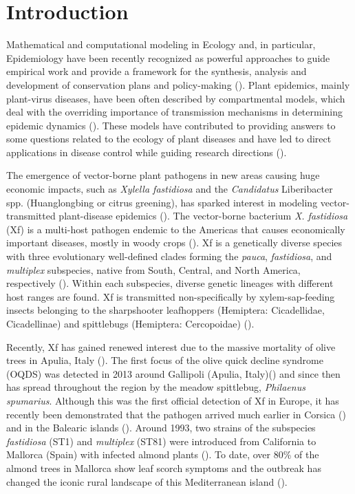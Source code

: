 \section{Introduction}

Mathematical and computational modeling in Ecology and, in particular,
Epidemiology have been recently recognized as powerful approaches to guide
empirical work and provide a framework for the synthesis, analysis and
development of conservation plans and policy-making
(\cite{levin1992mathematics,murray1989mathematical,sarkar2006biodiversity,Chew2014}).
Plant epidemics, mainly plant-virus diseases, have been often described by
compartmental models, which deal with the overriding importance of transmission
mechanisms in determining epidemic dynamics
(\cite{Jeger1998,Jeger2004,Madden2000}). These models have contributed to
providing answers to some questions related to the ecology of plant diseases
and have led to direct applications in disease control while guiding research
directions (\cite{Jeger2019}).

The emergence of vector-borne plant pathogens in new areas causing huge
economic impacts, such as \textit{Xylella fastidiosa} and the
\textit{Candidatus} Liberibacter spp. (Huanglongbing or citrus greening), has
sparked interest in modeling vector-transmitted plant-disease epidemics
(\cite{chiyaka2012modeling,Jeger2019}). The vector-borne bacterium \textit{X.
    fastidiosa} (Xf) is a multi-host pathogen endemic to the Americas that
causes
economically important diseases, mostly in woody crops (\cite{Hopkins2002}). Xf
is a genetically diverse species with three evolutionary well-defined clades
forming the \textit{pauca}, \textit{fastidiosa}, and \textit{multiplex}
subspecies, native from South, Central, and North America, respectively
(\cite{vanhove2019genomic}). Within each subspecies, diverse genetic lineages
with different host ranges are found. Xf is transmitted non-specifically by
xylem-sap-feeding insects belonging to the sharpshooter leafhoppers (Hemiptera:
Cicadellidae, Cicadellinae) and spittlebugs (Hemiptera: Cercopoidae)
(\cite{Redak2004}).

Recently, Xf has gained renewed interest due to the massive mortality of
olive trees in Apulia, Italy (\cite{saponari2019xylella}). The first focus of
the olive quick decline syndrome (OQDS) was detected in 2013 around Gallipoli
(Apulia, Italy)(\cite{saponari2013identification}) and since then has spread
throughout the region by the meadow spittlebug, \textit{Philaenus spumarius}.
Although this was the first official detection of Xf in Europe, it has recently
been demonstrated that the pathogen arrived much earlier in Corsica
(\cite{Soubeyrand2018}) and in the Balearic islands (\cite{Moralejo2020}).
Around 1993, two strains of the subspecies \textit{fastidiosa} (ST1) and
\textit{multiplex} (ST81) were introduced from California to Mallorca (Spain)
with infected almond plants (\cite{Moralejo2020}). To date, over 80\% of the
almond trees in Mallorca show leaf scorch symptoms and the outbreak has changed
the iconic rural landscape of this Mediterranean island (\cite{Olmo2021b}).

